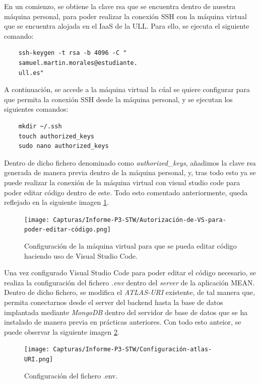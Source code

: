 \documentclass{report}
\begin{document}
  En un comienzo, se obtiene la clave rsa que se encuentra dentro de nuestra máquina personal, para poder realizar la conexión SSH con la máquina virtual que se encuentra alojada en el IaaS de la ULL. Para ello, se ejecuta el siguiente comando:

  \begin{verbatim}
    ssh-keygen -t rsa -b 4096 -C "
    samuel.martin.morales@estudiante.
    ull.es"
  \end{verbatim}

  A continuación, se accede a la máquina virtual la cúal se quiere configurar para que permita la conexión SSH desde la máquina personal, y se ejecutan los siguientes comandos:

  \begin{verbatim}
    mkdir ~/.ssh
    touch authorized_keys
    sudo nano authorized_keys
  \end{verbatim}

  Dentro de dicho fichero denominado como \emph{authorized\_keys}, añadimos la clave rsa generada de manera previa dentro de la máquina personal, y, tras todo esto ya se puede realizar la conexión de la máquina virtual con visual studio code para poder editar código dentro de este. Todo esto comentado anteriormente, queda reflejado en la siguiente imagen \ref{fig:Configuración-VSCode}.

  \begin{figure}[H]
    \centering
    \texttt{[image: Capturas/Informe-P3-STW/Autorización-de-VS-para-poder-editar-código.png]}
    \caption{Configuración de la máquina virtual para que se pueda editar código haciendo uso de Visual Studio Code.}
    \label{fig:Configuración-VSCode}
  \end{figure}
	
  Una vez configurado Visual Studio Code para poder editar el código necesario, se realiza la configuración del fichero \emph{.env} dentro del \emph{server} de la aplicación MEAN. Dentro de dicho fichero, se modifica el \emph{ATLAS-URI} existente, de tal manera que, permita conectarnos desde el server del backend hasta la base de datos implantada mediante \emph{MongoDB} dentro del servidor de base de datos que se ha instalado de manera previa en prácticas anteriores. Con todo esto anteior, se puede observar la siguiente imagen \ref{fig:Configuración-Fichero-env}.

  \begin{figure}[H]
    \centering
    \texttt{[image: Capturas/Informe-P3-STW/Configuración-atlas-URI.png]}
    \caption{Configuración del fichero .env.}
    \label{fig:Configuración-Fichero-env}
  \end{figure}
\end{document}
